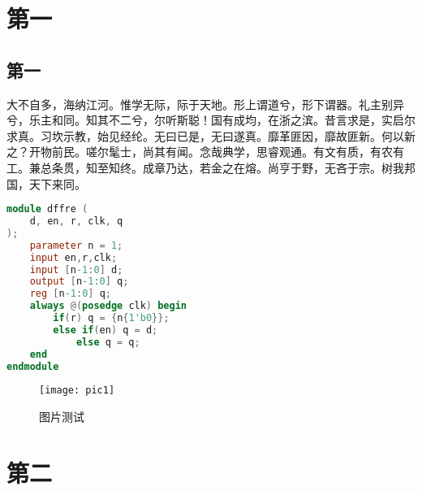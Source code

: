 \documentclass{source/Paper}
\date{\today}
\begin{document}
    \makeheader
    \section{第一}
        \subsection{第一}
            大不自多，海纳江河。惟学无际，际于天地。形上谓道兮，形下谓器。礼主别异兮，乐主和同。知其不二兮，尔听斯聪！国有成均，在浙之滨。昔言求是，实启尔求真。习坎示教，始见经纶。无曰已是，无曰遂真。靡革匪因，靡故匪新。何以新之？开物前民。嗟尔髦士，尚其有闻。念哉典学，思睿观通。有文有质，有农有工。兼总条贯，知至知终。成章乃达，若金之在熔。尚亨于野，无吝于宗。树我邦国，天下来同。

            

            \begin{lstlisting}[language = Verilog, title = {代码块测试（直接插入）}]
module dffre (
    d, en, r, clk, q
);
    parameter n = 1;
    input en,r,clk;
    input [n-1:0] d;
    output [n-1:0] q;
    reg [n-1:0] q;
    always @(posedge clk) begin
        if(r) q = {n{1'b0}};
        else if(en) q = d;
            else q = q;
    end
endmodule
            \end{lstlisting}

            \begin{figure}[H]
                \centering
                \texttt{[image: pic1]}
                \caption{图片测试}
            \end{figure}


    \section{第二}
\end{document}
